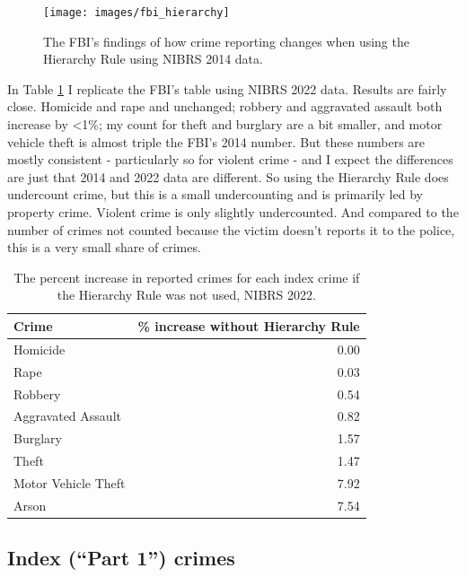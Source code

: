 \documentclass[
  12pt,
  openany]{book}
\begin{document}
\begin{figure}

{\centering \texttt{[image: images/fbi\_hierarchy]} 

}

\caption{The FBI's findings of how crime reporting changes when using the Hierarchy Rule using NIBRS 2014 data.}\label{fig:fbiHierarchy}
\end{figure}

In Table \ref{tab:nibrsHierarchy} I replicate the FBI's table using NIBRS 2022 data. Results are fairly close. Homicide and rape and unchanged; robbery and aggravated assault both increase by \textless1\%; my count for theft and burglary are a bit smaller, and motor vehicle theft is almost triple the FBI's 2014 number. But these numbers are mostly consistent - particularly so for violent crime - and I expect the differences are just that 2014 and 2022 data are different. So using the Hierarchy Rule does undercount crime, but this is a small undercounting and is primarily led by property crime. Violent crime is only slightly undercounted. And compared to the number of crimes not counted because the victim doesn't reports it to the police, this is a very small share of crimes.

\begin{longtable}[t]{lr}
\caption{\label{tab:nibrsHierarchy}The percent increase in reported crimes for each index crime if the Hierarchy Rule was not used, NIBRS 2022.}\\
\toprule
Crime & \% increase without Hierarchy Rule\\
\midrule
Homicide & 0.00\\
Rape & 0.03\\
Robbery & 0.54\\
Aggravated Assault & 0.82\\
Burglary & 1.57\\
\addlinespace
Theft & 1.47\\
Motor Vehicle Theft & 7.92\\
Arson & 7.54\\
\bottomrule
\end{longtable}

\subsection{Index (``Part 1'') crimes}\label{indexCrimes}
\end{document}
